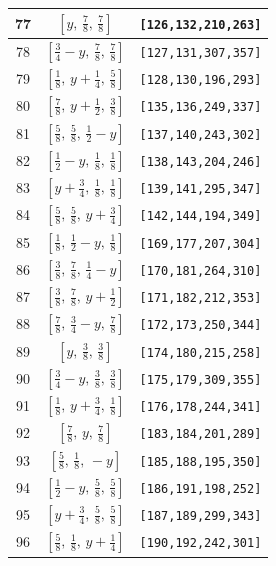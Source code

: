 \documentclass[fleqn,8pt]{jsarticle}
\begin{document}
\begin{longtable}{ccc}
77 & $\left[ y,\, \frac{7}{8},\, \frac{7}{8} \right]$ & {\tt [126,132,210,263]} \\ \hline
78 & $\left[ \frac{3}{4} - y,\, \frac{7}{8},\, \frac{7}{8} \right]$ & {\tt [127,131,307,357]} \\ \hline
79 & $\left[ \frac{1}{8},\, y + \frac{1}{4},\, \frac{5}{8} \right]$ & {\tt [128,130,196,293]} \\ \hline
80 & $\left[ \frac{7}{8},\, y + \frac{1}{2},\, \frac{3}{8} \right]$ & {\tt [135,136,249,337]} \\ \hline
81 & $\left[ \frac{5}{8},\, \frac{5}{8},\, \frac{1}{2} - y \right]$ & {\tt [137,140,243,302]} \\ \hline
82 & $\left[ \frac{1}{2} - y,\, \frac{1}{8},\, \frac{1}{8} \right]$ & {\tt [138,143,204,246]} \\ \hline
83 & $\left[ y + \frac{3}{4},\, \frac{1}{8},\, \frac{1}{8} \right]$ & {\tt [139,141,295,347]} \\ \hline
84 & $\left[ \frac{5}{8},\, \frac{5}{8},\, y + \frac{3}{4} \right]$ & {\tt [142,144,194,349]} \\ \hline
85 & $\left[ \frac{1}{8},\, \frac{1}{2} - y,\, \frac{1}{8} \right]$ & {\tt [169,177,207,304]} \\ \hline
86 & $\left[ \frac{3}{8},\, \frac{7}{8},\, \frac{1}{4} - y \right]$ & {\tt [170,181,264,310]} \\ \hline
87 & $\left[ \frac{3}{8},\, \frac{7}{8},\, y + \frac{1}{2} \right]$ & {\tt [171,182,212,353]} \\ \hline
88 & $\left[ \frac{7}{8},\, \frac{3}{4} - y,\, \frac{7}{8} \right]$ & {\tt [172,173,250,344]} \\ \hline
89 & $\left[ y,\, \frac{3}{8},\, \frac{3}{8} \right]$ & {\tt [174,180,215,258]} \\ \hline
90 & $\left[ \frac{3}{4} - y,\, \frac{3}{8},\, \frac{3}{8} \right]$ & {\tt [175,179,309,355]} \\ \hline
91 & $\left[ \frac{1}{8},\, y + \frac{3}{4},\, \frac{1}{8} \right]$ & {\tt [176,178,244,341]} \\ \hline
92 & $\left[ \frac{7}{8},\, y,\, \frac{7}{8} \right]$ & {\tt [183,184,201,289]} \\ \hline
93 & $\left[ \frac{5}{8},\, \frac{1}{8},\, - y \right]$ & {\tt [185,188,195,350]} \\ \hline
94 & $\left[ \frac{1}{2} - y,\, \frac{5}{8},\, \frac{5}{8} \right]$ & {\tt [186,191,198,252]} \\ \hline
95 & $\left[ y + \frac{3}{4},\, \frac{5}{8},\, \frac{5}{8} \right]$ & {\tt [187,189,299,343]} \\ \hline
96 & $\left[ \frac{5}{8},\, \frac{1}{8},\, y + \frac{1}{4} \right]$ & {\tt [190,192,242,301]} \\
\end{longtable}
\end{document}

